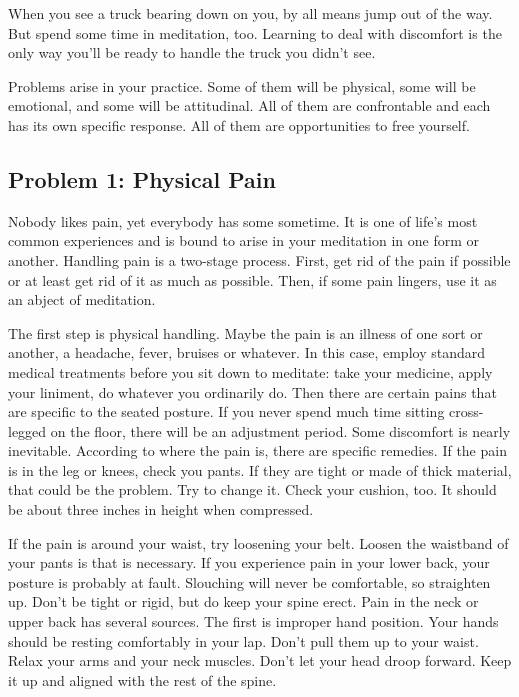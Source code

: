 When you see a truck bearing down on you, by all means jump out of the way. But
spend some time in meditation, too. Learning to deal with discomfort is the only
way you'll be ready to handle the truck you didn't see.

Problems arise in your practice. Some of them will be physical, some will be
emotional, and some will be attitudinal. All of them are confrontable and each
has its own specific response. All of them are opportunities to free yourself.

\subsection*{Problem 1: Physical Pain} Nobody likes pain, yet everybody has some sometime. It
is one of life's most common experiences and is bound to arise in your
meditation in one form or another. Handling pain is a two-stage process. First,
get rid of the pain if possible or at least get rid of it as much as possible.
Then, if some pain lingers, use it as an abject of meditation.

The first step is physical handling. Maybe the pain is an illness of one sort or
another, a headache, fever, bruises or whatever. In this case, employ standard
medical treatments before you sit down to meditate: take your medicine, apply
your liniment, do whatever you ordinarily do. Then there are certain pains that
are specific to the seated posture. If you never spend much time sitting
cross-legged on the floor, there will be an adjustment period. Some discomfort
is nearly inevitable. According to where the pain is, there are specific
remedies. If the pain is in the leg or knees, check you pants. If they are tight
or made of thick material, that could be the problem. Try to change it. Check
your cushion, too. It should be about three inches in height when compressed.

If the pain is around your waist, try loosening your belt. Loosen the waistband
of your pants is that is necessary. If you experience pain in your lower back,
your posture is probably at fault. Slouching will never be comfortable, so
straighten up. Don't be tight or rigid, but do keep your spine erect. Pain in
the neck or upper back has several sources. The first is improper hand position.
Your hands should be resting comfortably in your lap. Don't pull them up to your
waist. Relax your arms and your neck muscles. Don't let your head droop forward.
Keep it up and aligned with the rest of the spine.

